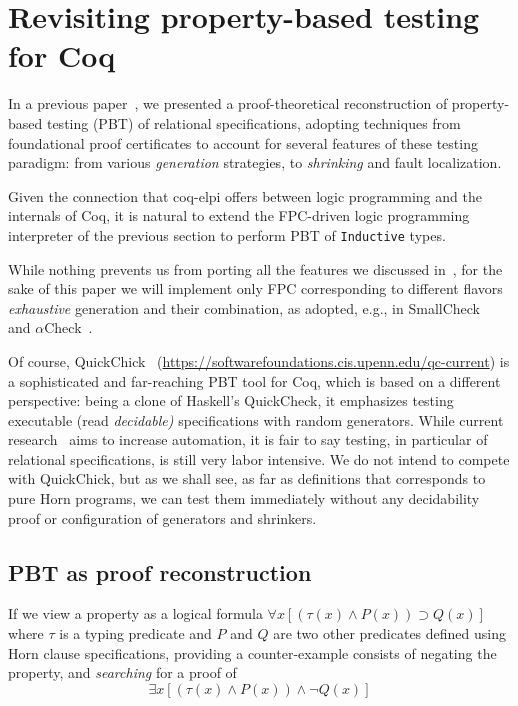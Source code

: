 \section{Revisiting property-based testing for Coq}

In a previous paper~\cite{blanco19ppdp}, we presented a
proof-theoretical reconstruction of property-based testing (PBT) of
relational specifications, adopting techniques from foundational proof
certificates to account for several features of these testing
paradigm: from various \emph{generation} strategies, to
\emph{shrinking} and fault localization.

Given the connection that \textsf{coq-elpi} offers between logic
programming and the internals of Coq, it is natural to extend the FPC-driven logic programming interpreter of the previous section to perform PBT of \lstinline{Inductive} types.

While nothing prevents us from porting all the features we discussed in~\cite{blanco19ppdp}, for the sake of this paper we will implement only FPC corresponding to different flavors \emph{exhaustive} generation and their combination, as adopted, e.g., in SmallCheck~\cite{smallcheck} and  $\alpha$Check~\cite{cheney_momigliano_2017}.

Of course, \textsf{QuickChick}~\cite{QChick}
(\url{https://softwarefoundations.cis.upenn.edu/qc-current}) is a
sophisticated and far-reaching PBT tool for Coq, which is based on a
different perspective: being a clone of Haskell's QuickCheck, it
emphasizes testing executable (read \emph{decidable)} specifications
with random generators. While current research~\cite{LampropoulosPP18} aims to increase automation, it is fair to say testing, in particular of  relational specifications, is still very labor intensive. We do not intend to compete with  \textsf{QuickChick}, but as we shall see, as far as  definitions that corresponds to pure Horn programs, we can test them immediately without any decidability proof or configuration of generators and shrinkers.


\subsection{PBT as proof reconstruction}
\label{ssec:pbt-lp}


 If we view  a property as a logical formula
\(\forall x [(\tau(x)\wedge P(x)) \supset Q(x)]\) where $\tau$ is a
typing predicate and $P$ and $Q$ are two other predicates defined
using Horn clause specifications, providing a counter-example
consists of  negating the property, and \emph{searching} for a proof of
\[
  \exists x [(\tau(x)\wedge P(x)) \wedge \neg Q(x)]
  \tag{*}\label{eq:full}
\]

